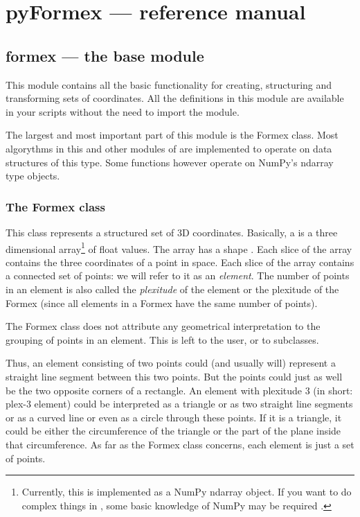 
\chapter{pyFormex --- reference manual}
{\label{cha:reference}

\section{formex --- the base module}
{\label{sec:formex}

This module contains all the basic functionality for creating, structuring and transforming sets of coordinates. All the definitions in this module are available in your scripts without the need to import the module.

The largest and most important part of this module is the Formex class. Most algorythms in this and other modules of \pyformex are implemented to operate on data structures of this type. Some functions however operate on NumPy's ndarray type objects.
 

\subsection{The Formex class}
This class represents a structured set of 3D coordinates. Basically, a  is a three dimensional array\footnote{Currently, this is implemented as a NumPy ndarray object. If you want to do complex things in \pyformex, some basic knowledge of NumPy may be required .} of float values. The array has a shape . Each slice \Code{[i,j]} of the array contains the three coordinates of a point in space. Each slice \Code{[i]} of the array contains a connected set of  points: we will refer to it as an \emph{element}. The number of points in an element is also called the \emph{plexitude} of the element or the plexitude of the Formex (since all elements in a Formex have the same number of points). 

The Formex class does not attribute any geometrical interpretation to the grouping of points in an element. This is left to the user, or to subclasses.

Thus, an element consisting of two points could (and usually will) represent a straight line segment between this two points. But the points could just as well be the two opposite corners of a rectangle.
An element with plexitude 3 (in short: plex-3 element) could be interpreted as a triangle or as two straight line segments or as a curved line or even as a circle through these points. If it is a triangle, it could be either the circumference of the triangle or the part of the plane inside that circumference. As far as the Formex class concerns, each element is just a set of points. 

}}
